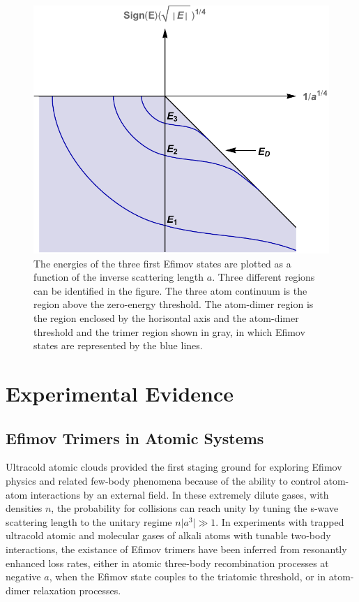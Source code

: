 \documentclass{article}
\providecommand{\abs}[1]{\lvert#1\rvert} \providecommand{\norm}[1]{\lVert#1\rVert}
\numberwithin{equation}{section}
\numberwithin{figure}{section}
\begin{document}
\begin{figure}
\centering
\includegraphics[width=0.75\linewidth]{efimov}
\caption{The energies of the three first Efimov states are plotted as a function of the inverse scattering length $a$. Three different regions can be identified in the figure. The three atom continuum is the region above the zero-energy threshold. The atom-dimer region is the region enclosed by the horisontal axis and the atom-dimer threshold and the trimer region shown in gray, in which Efimov states are represented by the blue lines.\cite{Kajsa_my}}\label{fig:efimov}
\end{figure} 

\section{Experimental Evidence}
\subsection{Efimov Trimers in Atomic Systems}
Ultracold atomic clouds provided the first staging ground for exploring Efimov physics and related few-body phenomena because of the ability to control atom-atom interactions by an external field. In these extremely dilute gases, with densities $n$, the probability for collisions can reach unity by tuning the s-wave scattering length to the unitary regime $n\abs{a^3}\gg1$. In experiments with trapped ultracold atomic and molecular gases of alkali atoms with tunable two-body interactions, the existance of Efimov trimers have been inferred from resonantly enhanced loss rates, either in atomic three-body recombination processes at negative $a$, when the Efimov state couples to the triatomic threshold, or in atom-dimer relaxation processes. 
\end{document}
